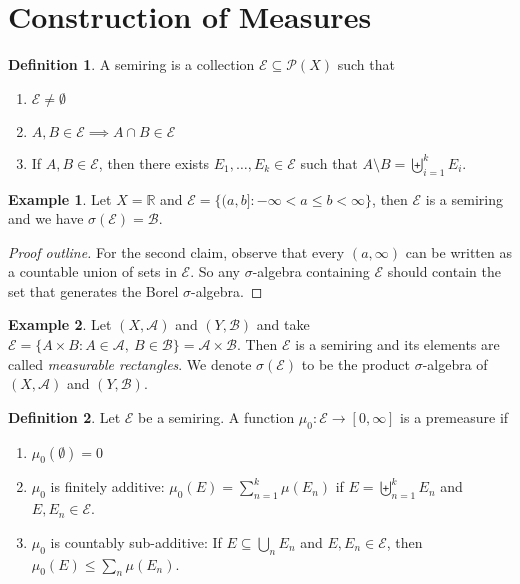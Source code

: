 \documentclass[letterpaper,12pt]{article}
\theoremstyle{definition}
\newtheorem{definition}{Definition}[section]
\newtheorem{example}{Example}[section]
\theoremstyle{plain}
\theoremstyle{remark}
\newcommand{\R}{\mathbb{R}}
\begin{document}
\newpage

\section{Construction of Measures}
\begin{definition}
A semiring is a collection $\mathcal{E}\subseteq \mathcal{P}(X)$ such that
\begin{enumerate}
  \item $\mathcal{E}\ne \emptyset$
  \item $A,B\in \mathcal{E} \implies A\cap B\in \mathcal{E}$
  \item If $A,B\in \mathcal{E}$, then there exists $E_1,\ldots, E_k\in \mathcal{E}$ such that $A\setminus B = \biguplus_{i=1}^k E_i$.
\end{enumerate}
\end{definition}

\begin{example}
Let $X = \R$ and $\mathcal{E} = \{(a,b]:-\infty<a\leq b < \infty\}$, then $\mathcal{E}$ is a semiring and we have $\sigma(\mathcal{E}) = \mathcal{B}$.
\end{example}

\begin{proof}[Proof outline]
For the second claim, observe that every $(a,\infty)$ can be written as a countable union of sets in $\mathcal{E}$. So any $\sigma$-algebra containing $\mathcal{E}$ should contain the set that generates the Borel $\sigma$-algebra.
\end{proof}

\begin{example}
Let $(X,\mathcal{A})$ and $(Y,\mathcal{B})$ and take $\mathcal{E} = \{A\times B:A\in \mathcal{A},\ B\in \mathcal{B}\} = \mathcal{A}\times \mathcal{B}$. Then $\mathcal{E}$ is a semiring and its elements are called \emph{measurable rectangles}. We denote $\sigma(\mathcal{E})$ to be the product $\sigma$-algebra of $(X,\mathcal{A})$ and $(Y,\mathcal{B})$.
\end{example}

\begin{definition}
Let $\mathcal{E}$ be a semiring. A function $\mu_0:\mathcal{E}\to[0,\infty]$ is a premeasure if
\begin{enumerate}
  \item $\mu_0(\emptyset)=0$
  \item $\mu_0$ is finitely additive: $\mu_0(E) = \sum_{n=1}^k \mu(E_n)$ if $E=\biguplus_{n=1}^k E_n$ and $E,E_n\in \mathcal{E}$.
  \item $\mu_0$ is countably sub-additive: If $E\subseteq \bigcup_n E_n$ and $E, E_n\in \mathcal{E}$, then $\mu_0(E) \leq \sum_n \mu(E_n)$.
\end{enumerate}
\end{definition}
\end{document}
